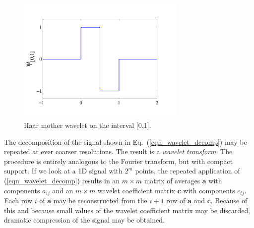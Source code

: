\documentclass[11pt]{book}
\begin{document}
\begin{figure}[ht]
\centering
\includegraphics[width=3.2in]{FIGURES/haar_mother}
\vskip-0.2cm
\caption[Haar mother wavelet]{Haar mother wavelet on the interval [0,1].}
\label{fig_haar_mother}
\end{figure}

The decomposition of the signal shown in Eq.~(\ref{eqn_wavelet_decomp}) may be repeated at ever coarser resolutions.  The result is a \emph{wavelet transform}. The procedure is entirely analogous to the Fourier transform, but with compact support.  If we look at a 1D signal with $2^m$ points, the repeated application of (\ref{eqn_wavelet_decomp}) results in an $m \times m$ matrix of averages $\mathbf{a}$ with components $a_{ij}$ and an $m \times m$ wavelet coefficient matrix $\mathbf{c}$ with components $c_{ij}$.  Each row $i$ of $\mathbf{a}$ may be reconstructed from the $i+1$ row of $\mathbf{a}$ and $\mathbf{c}$.  Because of this and because small values of the wavelet coefficient matrix may be discarded, dramatic compression of the signal may be obtained.
\end{document}
